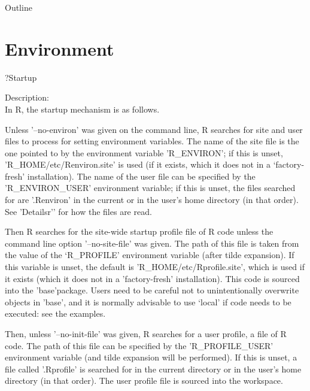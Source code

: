 \documentclass{beamer}
\begin{document}
\begin{frame}{Outline}
\end{frame}

\section*{Environment}

\begin{frame}{?Startup}
\begin{tiny}
Description:\\
\bigskip
In R, the startup mechanism is as follows.\\
\bigskip

Unless '--no-environ' was given on the command line, R searches
 for site and user files to process for setting environment
 variables.  The name of the site file is the one pointed to by the
  environment variable 'R\_ENVIRON'; if this is unset,
 {\color{red} 'R\_HOME/etc/Renviron.site' is used (if it exists, which it 
 does not in a `factory-fresh' installation)}.  The name of the user file
 can be specified by the 'R\_ENVIRON\_USER' environment variable; if
 this is unset, the files searched for are {\color{blue} '.Renviron' 
 in the	current or in the user's home directory (in that order)}.  See
 'Detailsr'’ for how the files are read.\\
\bigskip

Then R searches for the site-wide startup profile file of R code
 unless the command line option '--no-site-file' was given.  The
 path of this file is taken from the value of the `R\_PROFILE'
 environment variable (after tilde expansion).  If this variable is
 unset, {\color{blue} the default is 'R\_HOME/etc/Rprofile.site', 
 which is used if it exists (which it does not in a 'factory-fresh' 
 installation)}. This code is sourced into the 'base'package.  
 Users need to be careful not to unintentionally overwrite objects 
 in 'base', and it is normally advisable to use ‘local’ if code 
 needs to be executed: see the examples.\\
\bigskip

Then, unless '--no-init-file' was given, R searches for a user
 profile, a file of R code.  The path of this file can be specified
 by the 'R\_PROFILE\_USER' environment variable (and tilde expansion
 will be performed).  If this is unset, {\color{green} a file called 
 '.Rprofile' is searched for in the current directory or in the user's
 home directory (in that order)}.  The user profile file is sourced into
 the workspace.\\
\bigskip

\end{tiny}

\end{frame}
\end{document}
